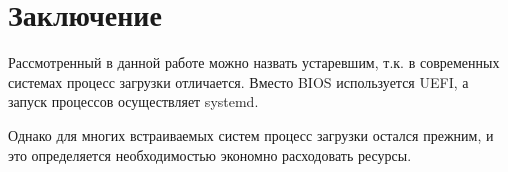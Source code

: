 \newpage
\section*{Заключение}

Рассмотренный в данной работе можно назвать устаревшим, т.к. в современных системах процесс загрузки отличается. Вместо BIOS используется UEFI, а запуск процессов осуществляет systemd.

Однако для многих встраиваемых систем процесс загрузки остался прежним, и это определяется необходимостью экономно расходовать ресурсы.